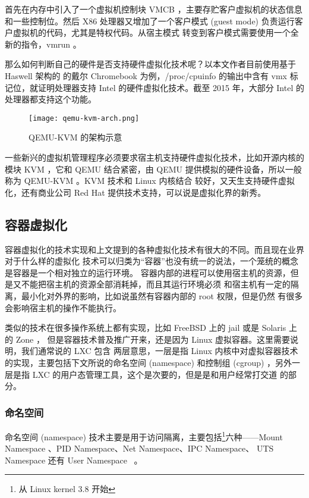 首先在内存中引入了一个虚拟机控制块 VMCB ，主要存贮客户虚拟机的状态信息和一些控制位。然后 X86
处理器又增加了一个客户模式 (guest mode) 负责运行客户虚拟机的代码，尤其是特权代码。从宿主模式
转变到客户模式需要使用一个全新的指令，vmrun 。

那么如何判断自己的硬件是否支持硬件虚拟化技术呢？以本文作者目前使用基于 Haswell 架构的
的戴尔 Chromebook 为例，/proc/cpuinfo 的输出中含有 vmx 标记位，就证明处理器支持
 Intel 的硬件虚拟化技术。截至 2015 年，大部分 Intel 的处理器都支持这个功能。

 \begin{figure}[h]
     \centering
     \texttt{[image: qemu-kvm-arch.png]}
     \caption{QEMU-KVM 的架构示意}
 \end{figure}

一些新兴的虚拟机管理程序必须要求宿主机支持硬件虚拟化技术，比如开源内核的模块 KVM ，它和 QEMU
结合紧密，由 QEMU 提供模拟的硬件设备，所以一般称为 QEMU-KVM 。KVM 技术和 Linux 内核结合
较好，又天生支持硬件虚拟化，还有商业公司 Red Hat 提供技术支持，可以说是虚拟化界的新秀。

\subsection{容器虚拟化}

容器虚拟化的技术实现和上文提到的各种虚拟化技术有很大的不同。而且现在业界对于什么样的虚拟化
技术可以归类为“容器”也没有统一的说法，一个笼统的概念是容器是一个相对独立的运行环境。
容器内部的进程可以使用宿主机的资源，但是又不能把宿主机的资源全部消耗掉，而且其运行环境必须
和宿主机有一定的隔离，最小化对外界的影响，比如说虽然有容器内部的 root 权限，但是仍然
有很多会影响宿主机的操作不能执行。

类似的技术在很多操作系统上都有实现，比如 FreeBSD 上的 jail 或是 Solaris 上的 Zone ，
但是容器技术普及推广开来，还是因为 Linux 虚拟容器。这里需要说明，我们通常说的 LXC 包含
两层意思，一层是指 Linux 内核中对虚拟容器技术的实现，主要包括下文所说的命名空间 (namespace)
和控制组 (cgroup) ，另外一层是指 LXC 的用户态管理工具，这个是次要的，但是是和用户经常打交道
的部分。

\subsubsection{命名空间}

命名空间 (namespace) 技术主要是用于访问隔离，主要包括\footnote{从 Linux kernel
 3.8 开始}六种——Mount Namespace 、PID Namespace、Net Namespace、IPC Namespace、
UTS Namespace 还有 User Namespace ~\cite{docker-in-practice}。


